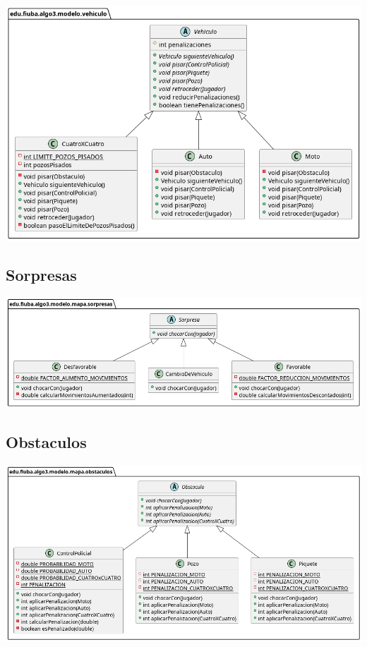 \documentclass[titlepage,a4paper]{article}
\begin{document}
\begin{center}
\includegraphics[width=.9\linewidth]{./diagramas/clases-vehiculo.png}
\end{center}

\subsection{Sorpresas}
\label{sec:orgbb2fed3}

\begin{center}
\includegraphics[width=.9\linewidth]{./diagramas/clases-sorpresas.png}
\end{center}

\subsection{Obstaculos}
\label{sec:org244f9ba}

\begin{center}
\includegraphics[width=.9\linewidth]{./diagramas/clases-obstaculos.png}
\end{center}
\end{document}
